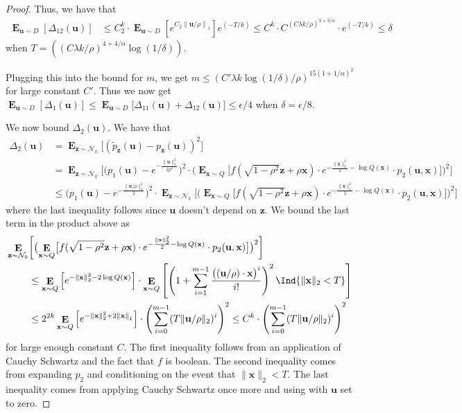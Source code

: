 \documentclass[10pt,a4paper]{article}
\newcommand\twonorm[1]{\|#1\|_2}
\newcommand\norm[1]{\left\| #1 \right\|}
\renewcommand\vec[1]{\mathbf{#1}}
\DeclareMathOperator*{\E}{\mathbf{E}}
\newcommand{\1}{\Ind}
\newcommand{\x}{\vec x}
\newcommand{\vu}{\vec u}
\newcommand{\z}{\vec z}
\newcommand{\Gauss}{\mathcal{N}}
\begin{document}
\begin{proof}
      Thus, we have that 
      \begin{align*}
        \E_{\vu\sim D}\left[{\Delta_{12}(\vu)}\right]&\leq C_2^{k}\cdot \E_{\vu\sim D}\left[e^{C_2\norm{\vu/\rho}_1}\right]e^{(-T/k)}
        \leq C^k\cdot C^{(C\lambda k/\rho)^{3+3/\alpha}}\cdot e^{(-T/k)}
        \leq \delta
      \end{align*}
      when $T= ((C\lambda k/\rho)^{4+4/\alpha}\log (1/\delta) )$.  
      
      Plugging this into the bound for $m$, we get $m\leq (C'\lambda k\log(1/\delta)/\rho)^{15(1+1/\alpha)^2}$ for large constant $C'$. Thus we now get $ \E_{\vu\sim D}\left[\Delta_1(\vu)\right]\leq\E_{\vu\sim D}\bigl[{\Delta_{11}(\vu)+\Delta_{12}(\vu)}\bigr]\leq \epsilon/4$ when $\delta=\epsilon/8$.  
      
      We now bound $\Delta_2(\vu)$. We have that 
   \begin{align*}
    \Delta_2(\vu)&=\E_{\z\sim \Gauss_{k}}\bigl[(\tilde{p}_{\z}(\vu)-{p}_{\z}(\vu))^2\bigr]\\
   &=\E_{\z\sim \Gauss_{k}}\biggl[\bigl(p_1(\vu)-e^{-\frac{\twonorm{\vu}^2}{2\rho^2}}\bigr)^2\cdot \bigl(\E_{\x\sim Q}\bigl[f(\sqrt{1-\rho^2}\z+\rho\x)\cdot e^{-\frac{\twonorm{\x}^2}{2}-\log Q(\x)}\cdot p_2(\vu,\x)\bigr]\bigr)^2\biggr]\\ 
   &\leq  \bigl(p_1(\vu)-e^{-\frac{\twonorm{\vu/\rho}^2}{2}}\bigr)^2\cdot \E_{\z\sim \Gauss_{k}}\biggl[\bigl(\E_{\x\sim Q}\bigl[f(\sqrt{1-\rho^2}\z+\rho\x)\cdot e^{-\frac{\twonorm{\x}^2}{2}-\log Q(\x)}\cdot p_2(\vu,\x)\bigr]\bigr)^2\biggr]
\end{align*} where the last inequality follows since $\vu$ doesn't depend on $\z$. We bound the last term in the product above as
\begin{align*}
    \E_{\z\sim \Gauss_{k}}&\biggl[\bigl(\E_{\x\sim Q}\bigl[ f(\sqrt{1-\rho^2}\z+\rho\x)\cdot e^{-\frac{\twonorm{\x}^2}{2}-\log Q(\x)}\cdot p_2(\vu,\x)\bigr]\bigr)^2\biggr] \\&\leq {\E_{\x\sim Q}\left[e^{-\twonorm{\x}^2-2\log Q(\x)}\right]\cdot \E_{\x\sim Q}\left[\left(1+\sum_{i=1}^{m-1}\frac{\bigl((\vu/\rho)\cdot \x\bigr)^i}{i!}\right)^2\1\{\twonorm{\x}<T\}\right]}\\
    &\leq {2^{2k}\E_{\x\sim Q}\left[e^{-\twonorm{\x}^2+2\norm{\x}_1}\right]\cdot \left(\sum_{i=0}^{m-1}(T\twonorm{\vu/\rho})^i\right)^2}
    \leq C^{k}\cdot \left(\sum_{i=0}^{m-1}(T\twonorm{\vu/\rho})^i\right)^2
\end{align*}
for large enough constant $C$. The first inequality follows from an application of Cauchy Schwartz and the fact that $f$ is boolean. The second inequality comes from expanding $p_2$ and conditioning on the event that $\twonorm{\x}<T$. The last inequality comes from  applying Cauchy Schwartz once more and using  with $\vu$ set to zero.


\end{proof}
\end{document}
